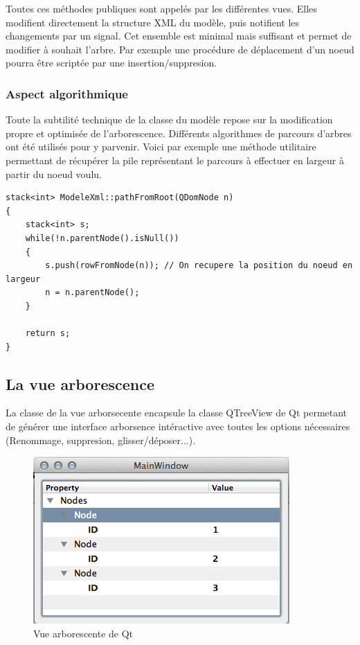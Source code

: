 Toutes ces méthodes publiques sont appelés par les différentes vues.
Elles modifient directement la structure XML du modèle, puis notifient les changements par un signal.
Cet ensemble est minimal mais suffisant et permet de modifier à souhait l'arbre.
Par exemple une procédure de déplacement d'un noeud pourra être scriptée par une insertion/suppresion.

\subsubsection{Aspect algorithmique}
Toute la subtilité technique de la classe du modèle repose sur la modification propre et optimisée de l'arborescence.
Différents algorithmes de parcours d'arbres ont été utilisés pour y parvenir. Voici par exemple une méthode utilitaire permettant de récupérer la pile représentant le parcours à effectuer en largeur à partir du noeud voulu.

\begin{lstlisting}
stack<int> ModeleXml::pathFromRoot(QDomNode n)
{
    stack<int> s;
    while(!n.parentNode().isNull())
    {
        s.push(rowFromNode(n)); // On recupere la position du noeud en largeur
        n = n.parentNode();
    }

    return s;
}
\end{lstlisting}

\subsection{La vue arborescence}

La classe de la vue arborsecente encapsule la classe QTreeView de Qt permetant de générer une interface arborsence
intéractive avec toutes les options nécessaires (Renommage, suppresion, glisser/déposer...).

\begin{figure}[h!]
\begin{minipage}[b]{\linewidth}
\centering \includegraphics[scale=0.5]{images/arbo.png}
\caption{Vue arborescente de Qt}
\label{arbo}
\end{minipage}
\end{figure}


